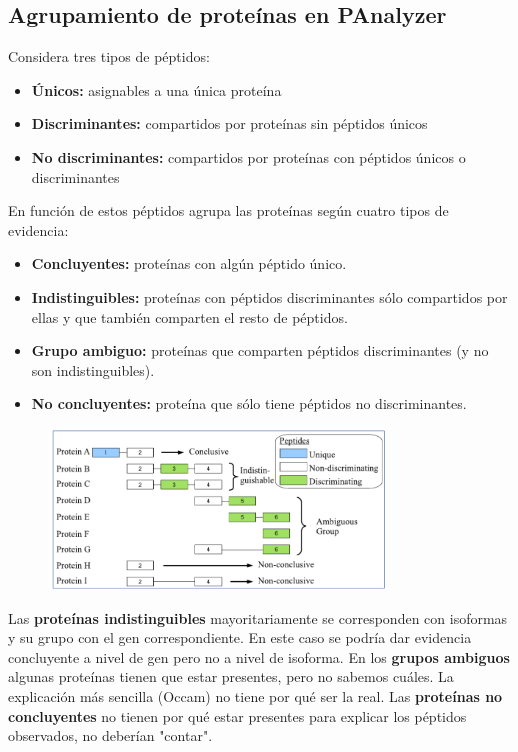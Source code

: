 \subsection{Agrupamiento de proteínas en PAnalyzer}
Considera tres tipos de péptidos:
\begin{itemize}
\item \textbf{Únicos:} asignables a una única proteína
\item \textbf{Discriminantes:} compartidos por proteínas sin péptidos únicos
\item \textbf{No discriminantes:} compartidos por proteínas con péptidos únicos o discriminantes
\end{itemize}

En función de estos péptidos agrupa las proteínas según cuatro tipos de evidencia:
\begin{itemize}
\item \textbf{Concluyentes:} proteínas con algún péptido único.
\item \textbf{Indistinguibles:} proteínas con péptidos discriminantes sólo compartidos por ellas y que también comparten el resto de péptidos.
\item \textbf{Grupo ambiguo:} proteínas que comparten péptidos discriminantes (y no son indistinguibles).
\item \textbf{No concluyentes:} proteína que sólo tiene péptidos no discriminantes.
\end{itemize}

\begin{figure}[h]
\centering
\includegraphics[width = 0.8\textwidth]{figs/panalyzer.png}
\end{figure}

Las \textbf{proteínas indistinguibles} mayoritariamente se corresponden con isoformas y su grupo con el gen correspondiente. En este caso se podría dar evidencia concluyente a nivel de gen pero no a nivel de isoforma. En los \textbf{grupos ambiguos} algunas proteínas tienen que estar presentes, pero no sabemos cuáles. La explicación más sencilla (Occam) no tiene por qué ser la real. Las \textbf{proteínas no concluyentes} no tienen por qué estar presentes para explicar los péptidos observados, no deberían "contar".

